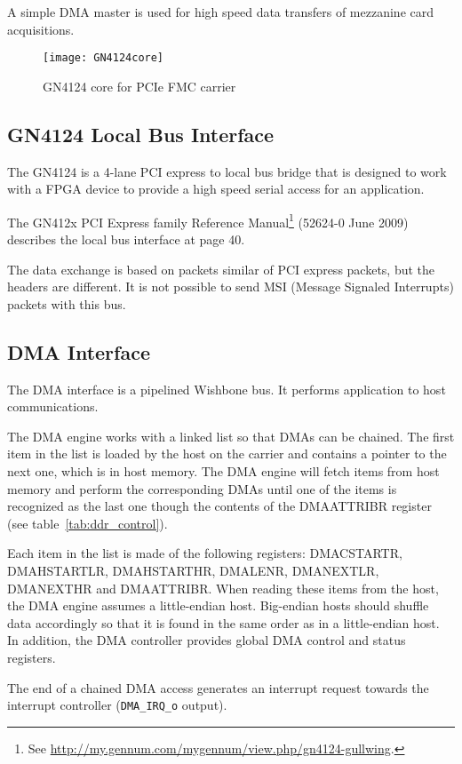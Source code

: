 \documentclass[10pt,a4paper]{cerndoc}
\begin{document}
  A simple DMA master is used for high speed data transfers of mezzanine card acquisitions.
  
\begin{figure}[!ht]
	\centering
		\texttt{[image: GN4124core]}
	\caption{GN4124 core for PCIe FMC carrier}
	\label{fig:GCWWM}
\end{figure} 
    \subsection{GN4124 Local Bus Interface}
    
The GN4124 is a 4-lane PCI express to local bus bridge that is designed to work with a FPGA device to provide a high speed serial access for an application.
    
The GN412x PCI Express family Reference Manual\footnote{See \href{http://my.gennum.com/mygennum/view.php/gn4124-gullwing}{http://my.gennum.com/mygennum/view.php/gn4124-gullwing}.} (52624-0 June 2009) describes the local bus interface at page 40.

The data exchange is based on packets similar of PCI express packets, but the headers are different. It is not possible to send MSI (Message Signaled Interrupts) packets with this bus.
    
    \subsection{DMA Interface}
The DMA interface is a pipelined Wishbone bus. It performs application to host communications.

The DMA engine works with a linked list so that DMAs can be chained. The first item in the list is loaded by the host on the carrier and contains a pointer to the next one, which is in host memory. The DMA engine will fetch items from host memory and perform the corresponding DMAs until one of the items is recognized as the last one though the contents of the DMAATTRIBR register (see table~\ref{tab:ddr_control}). 

Each item in the list is made of the following registers: DMACSTARTR, DMAHSTARTLR, DMAHSTARTHR, DMALENR, DMANEXTLR, DMANEXTHR and DMAATTRIBR. When reading these items from the host, the DMA engine assumes a little-endian host. Big-endian hosts should shuffle data accordingly so that it is found in the same order as in a little-endian host. In addition, the DMA controller provides global DMA control and status registers.

The end of a chained DMA access generates an interrupt request towards the interrupt controller (\verb+DMA_IRQ_o+ output).  
\end{document}
